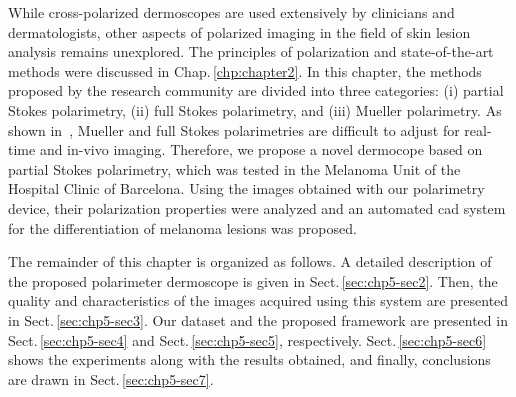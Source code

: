 While cross-polarized dermoscopes are used extensively by clinicians and dermatologists, other aspects of polarized imaging in the field of skin lesion analysis remains unexplored. 
The principles of polarization and state-of-the-art methods were discussed in Chap.\,\ref{chp:chapter2}.
In this chapter, the methods proposed by the research community are divided into three categories: (i) partial Stokes polarimetry, (ii) full Stokes polarimetry, and (iii) Mueller polarimetry.
As shown in~\cite{tchvialeva2013polarization}, Mueller and full Stokes polarimetries are difficult to adjust for real-time and in-vivo imaging.
Therefore, we propose a novel dermocope based on partial Stokes polarimetry, which was tested in the Melanoma Unit of the Hospital Clinic of Barcelona.
Using the images obtained with our polarimetry device, their polarization properties were analyzed and an automated \ac{cad} system for the differentiation of melanoma lesions was proposed.

The remainder of this chapter is organized as follows. 
A detailed description of the proposed polarimeter dermoscope is given in Sect.\,\ref{sec:chp5-sec2}.
Then, the quality and characteristics of the images acquired using this system are presented in Sect.\,\ref{sec:chp5-sec3}.
Our dataset and the proposed framework are presented in Sect.\,\ref{sec:chp5-sec4} and Sect.\,\ref{sec:chp5-sec5}, respectively.
Sect.\,\ref{sec:chp5-sec6} shows the experiments along with the results obtained, and finally, conclusions are drawn in Sect.\,\ref{sec:chp5-sec7}.









